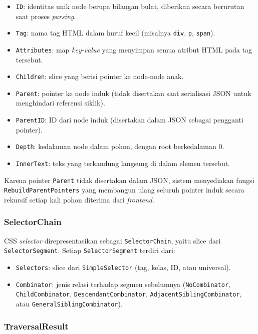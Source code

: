 \begin{itemize}
    \item \texttt{ID}: identitas unik node berupa bilangan bulat, diberikan secara berurutan saat proses \textit{parsing}.
    \item \texttt{Tag}: nama tag HTML dalam huruf kecil (misalnya \texttt{div}, \texttt{p}, \texttt{span}).
    \item \texttt{Attributes}: map \textit{key-value} yang menyimpan semua atribut HTML pada tag tersebut.
    \item \texttt{Children}: slice yang berisi pointer ke node-node anak.
    \item \texttt{Parent}: pointer ke node induk (tidak disertakan saat serialisasi JSON untuk menghindari referensi siklik).
    \item \texttt{ParentID}: ID dari node induk (disertakan dalam JSON sebagai pengganti pointer).
    \item \texttt{Depth}: kedalaman node dalam pohon, dengan root berkedalaman 0.
    \item \texttt{InnerText}: teks yang terkandung langsung di dalam elemen tersebut.
\end{itemize}

Karena pointer \texttt{Parent} tidak disertakan dalam JSON, sistem menyediakan fungsi \texttt{RebuildParentPointers} yang membangun ulang seluruh pointer induk secara rekursif setiap kali pohon diterima dari \textit{frontend}.

\subsubsection{SelectorChain}

CSS \textit{selector} direpresentasikan sebagai \texttt{SelectorChain}, yaitu slice dari \texttt{SelectorSegment}. Setiap \texttt{SelectorSegment} terdiri dari:
\begin{itemize}
    \item \texttt{Selectors}: slice dari \texttt{SimpleSelector} (tag, kelas, ID, atau universal).
    \item \texttt{Combinator}: jenis relasi terhadap segmen sebelumnya (\texttt{NoCombinator}, \texttt{ChildCombinator}, \texttt{DescendantCombinator}, \texttt{AdjacentSiblingCombinator}, atau \texttt{GeneralSiblingCombinator}).
\end{itemize}

\subsubsection{TraversalResult}


